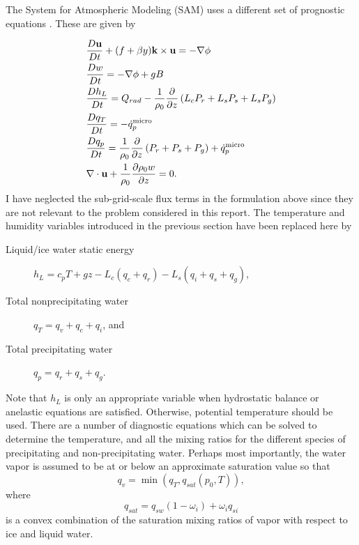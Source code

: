 \documentclass{report}
\newcommand{\1}[1]{\mathds{1}\left[#1\right]}
\begin{document}
The System for Atmospheric Modeling (SAM) uses a different set of prognostic
equations \autocite{Khairoutdinov2003}. These are given by

\begin{subequations}
  \label{eq:sam}
  \begin{align}
    &\frac{D \mathbf{u}}{D t} + ( f  + \beta y) \mathbf{k}\times \mathbf{u} = - \nabla \phi \\
    &\frac{D w}{D t} = -\nabla \phi + g B \label{eq:w-full}\\
    &\frac{D h_L}{D t}  = Q_{rad}  - \frac{1}{\rho_0} \frac{\partial }{\partial z} \left( L_c P_r + L_s P_s + L_s P_g \right)\\
    &\frac{D q_T}{D t} = -  \dot{q}_p^{\text{micro}} \label{eq:sam-qT}\\
    &\frac{D q_p}{D t} = \frac{1}{\rho_0} \frac{\partial }{\partial z} \left(  P_r +  P_s + P_g \right) + \dot{q}_p^{\text{micro}}\\
    &\nabla \cdot \mathbf{u} + \frac{1}{\rho_0} \frac{\partial \rho_0 w}{\partial z}  = 0.
  \end{align}
\end{subequations}
I have neglected the sub-grid-scale flux terms in the formulation above since
they are not relevant to the problem considered in this report. The temperature
and humidity variables introduced in the previous section have been replaced
here by
\begin{description}
\item[Liquid/ice water static energy] $h_L = c_p T +gz - L_c (q_c + q_r) - L_s
  (q_i + q_s + q_g)$,
\item[Total nonprecipitating water] $q_T = q_v + q_c + q_i$, and
\item[Total precipitating water] $q_p = q_r + q_s + q_g$.
\end{description}
Note that $h_L$ is only an appropriate variable when hydrostatic balance or
anelastic equations are satisfied. Otherwise, potential temperature should be
used. There are a number of diagnostic equations which can be solved to
determine the temperature, and all the mixing ratios for the different species
of precipitating and non-precipitating water. Perhaps most importantly, the
water vapor is assumed to be at or below an approximate saturation value so that
\[q_v = \min(q_T, q_{sat}(p_0, T)),\]
where
\[ q_{sat} = q_{sw} (1-\omega_i) + \omega_i q_{si}\]
is a convex combination of the saturation mixing ratios of vapor with respect to
ice and liquid water. 
\end{document}
